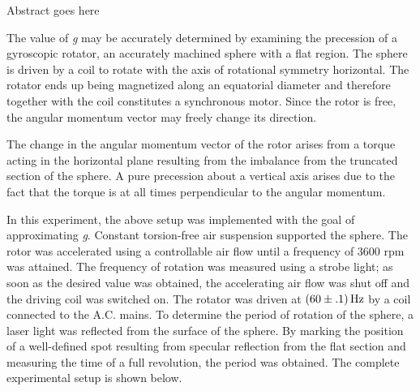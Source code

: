 
\physics

\begin{paperabs}

	Abstract goes here
	
\end{paperabs}

\begin{paper}
	
	
	The value of \textit{g} may be accurately determined by examining the precession of a gyroscopic rotator, an accurately machined sphere with a flat region. The sphere is driven by a coil to rotate with the axis of rotational symmetry horizontal. The rotator ends up being magnetized along an equatorial diameter and therefore together with the coil constitutes a synchronous motor. Since the rotor is free, the angular momentum vector may freely change its direction. 
	
	The change in the angular momentum vector of the rotor arises from a torque acting in the horizontal plane resulting from the imbalance from the truncated section of the sphere. A pure precession about a vertical axis arises due to the fact that the torque is at all times perpendicular to the angular momentum. 
	
	In this experiment, the above setup was implemented with the goal of approximating \textit{g}. Constant torsion-free air suspension supported the sphere. The rotor was accelerated using a controllable air flow until a frequency of \( 3600 \) rpm was attained. The frequency of rotation was measured using a strobe light; as soon as the desired value was obtained, the accelerating air flow was shut off and the driving coil was switched on. The rotator was driven at \( \left(60 \pm .1\right) \si{\hertz} \) by a coil connected to the A.C. mains. To determine the period of rotation of the sphere, a laser light was reflected from the surface of the sphere. By marking the position of a well-defined spot resulting from specular reflection from the flat section and measuring the time of a full revolution, the period was obtained. The complete experimental setup is shown below.
	
	

\end{paper}
